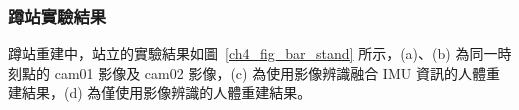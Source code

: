 
\clearpage

\subsubsection*{蹲站實驗結果}
蹲站重建中，站立的實驗結果如圖~\ref{ch4_fig_bar_stand} 所示，(a)、(b) 為同一時刻點的 cam01 影像及 cam02 影像，(c) 為使用影像辨識融合 IMU 資訊的人體重建結果，(d) 為僅使用影像辨識的人體重建結果。

